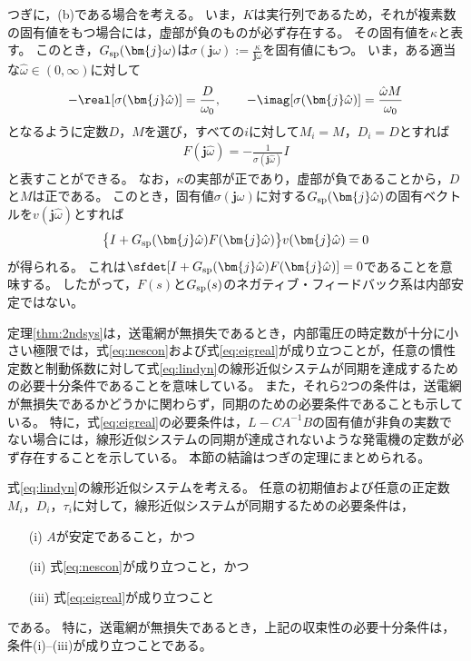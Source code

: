\documentclass[tombow,dvipdfmx]{corona-a5}
\begin{document}
\begin{証明}
つぎに，(b)である場合を考える。
いま，$K$は実行列であるため，それが複素数の固有値をもつ場合には，虚部が負のものが必ず存在する。
その固有値を$\kappa$と表す。
このとき，$G_{\rm sp}(\bm{j} \omega)$は$\sigma (\bm{j} \omega):= \frac{\kappa}{\bm{j} \omega}$を固有値にもつ。
いま，ある適当な$\hat{\omega}\in (0,\infty)$に対して
\begin{align}\label{eq:Fspara}
-\real[\sigma(\bm{j} \hat{\omega})]  = \frac{D}{\omega_0}
,\qquad
-\imag[\sigma(\bm{j} \hat{\omega})]  = \frac{\hat{\omega} M}{\omega_0}
\end{align}
となるように定数$D$，$M$を選び，すべての$i$に対して$M_i=M$，$D_i=D$とすれば
\begin{align*}
F(\bm{j} \hat{\omega}) = - \frac{1}{ \sigma(\bm{j} \hat{\omega}) } I
\end{align*}
と表すことができる。
なお，$\kappa$の実部が正であり，虚部が負であることから，$D$と$M$は正である。
このとき，固有値$\sigma (\bm{j} \omega)$に対する$G_{\rm sp}(\bm{j} \hat{\omega})$の固有ベクトルを$v(\bm{j} \hat{\omega})$とすれば
\begin{align*}
\bigl\{ I+G_{\rm sp}(\bm{j} \hat{\omega})F(\bm{j} \hat{\omega})\bigr\}
v(\bm{j} \hat{\omega})
=0
\end{align*}
が得られる。
これは$\sfdet [I+G_{\rm sp}(\bm{j} \hat{\omega}) F(\bm{j} \hat{\omega})]=0$であることを意味する。
したがって，$F(s)$と$G_{\rm sp}(s)$のネガティブ・フィードバック系は内部安定ではない。
\end{証明}




定理\ref{thm:2ndsys}は，送電網が無損失であるとき，内部電圧の時定数が十分に小さい極限では，式\ref{eq:nescon}および式\ref{eq:eigreal}が成り立つことが，任意の慣性定数と制動係数に対して式\ref{eq:lindyn}の線形近似システムが同期を達成するための必要十分条件であることを意味している。
また，それら2つの条件は，送電網が無損失であるかどうかに関わらず，同期のための必要条件であることも示している。
特に，式\ref{eq:eigreal}の必要条件は，$L-CA^{-1}B$の固有値が非負の実数でない場合には，線形近似システムの同期が達成されないような発電機の定数が必ず存在することを示している。
本節の結論はつぎの定理にまとめられる。


\begin{定理}[線形近似システムの同期条件]\label{thm:sync}
式\ref{eq:lindyn}の線形近似システムを考える。
任意の初期値および任意の正定数$M_i$，$D_i$，$\tau_i$に対して，線形近似システムが同期するための必要条件は，
\begin{itemize}
\item[(i)] $A$が安定であること，かつ
\item[(ii)] 式\ref{eq:nescon}が成り立つこと，かつ
\item[(iii)] 式\ref{eq:eigreal}が成り立つこと
\end{itemize}
である。
特に，送電網が無損失であるとき，上記の収束性の必要十分条件は，条件(i)--(iii)が成り立つことである。
\end{定理}
\end{document}
